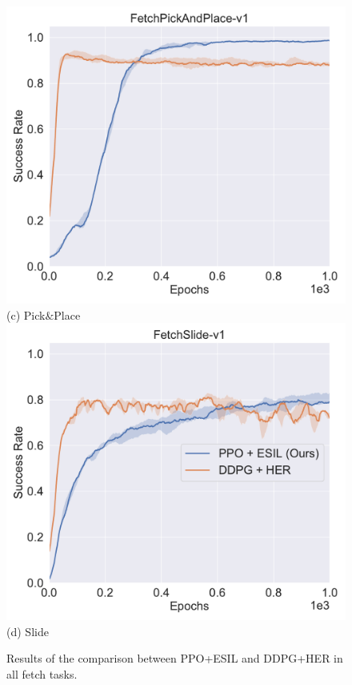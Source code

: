 \begin{figure}[h!]
  \includegraphics[width=\linewidth]{figures/chapter3/pick_her.pdf}
  ({c}) Pick$\&$Place
\endminipage
{}%
  \centering
  \includegraphics[width=\linewidth]{figures/chapter3/slide_her.pdf}
  ({d}) Slide
\endminipage\hfill
\caption{Results of the comparison between PPO+ESIL and DDPG+HER in all fetch tasks. }
\label{fig:her_compare}
\end{figure}


